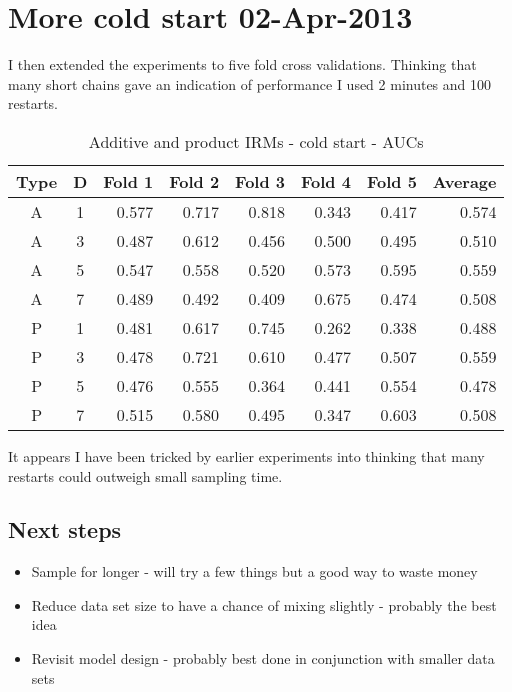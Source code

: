 \documentclass[twoside,11pt]{article}
\begin{document}
\section{More cold start 02-Apr-2013}

I then extended the experiments to five fold cross validations.
Thinking that many short chains gave an indication of performance I used 2 minutes and 100 restarts.
\begin{table*}[ht!]
\caption{{\small
Additive and product IRMs - cold start - AUCs
}}
\label{tbl:IRM 02-Apr-2013}
\begin{center}
\begin{tabular}{c c | r r r r r | r}
Type & D & Fold 1 & Fold 2 & Fold 3 & Fold 4 & Fold 5 & Average \\
\hline
A & 1 & 0.577 & 0.717 & 0.818 & 0.343 & 0.417 & 0.574\\
A & 3 & 0.487 & 0.612 & 0.456 & 0.500 & 0.495 & 0.510\\
A & 5 & 0.547 & 0.558 & 0.520 & 0.573 & 0.595 & 0.559\\
A & 7 & 0.489 & 0.492 & 0.409 & 0.675 & 0.474 & 0.508\\
P & 1 & 0.481 & 0.617 & 0.745 & 0.262 & 0.338 & 0.488\\
P & 3 & 0.478 & 0.721 & 0.610 & 0.477 & 0.507 & 0.559\\
P & 5 & 0.476 & 0.555 & 0.364 & 0.441 & 0.554 & 0.478\\
P & 7 & 0.515 & 0.580 & 0.495 & 0.347 & 0.603 & 0.508\\
\end{tabular}
\end{center}
\end{table*}

It appears I have been tricked by earlier experiments into thinking that many restarts could outweigh small sampling time.

\subsection{Next steps}

\begin{itemize}
\item Sample for longer - will try a few things but a good way to waste money
\item Reduce data set size to have a chance of mixing slightly - probably the best idea
\item Revisit model design - probably best done in conjunction with smaller data sets
\end{itemize}

\newpage


\vskip 0.2in

\end{document}
